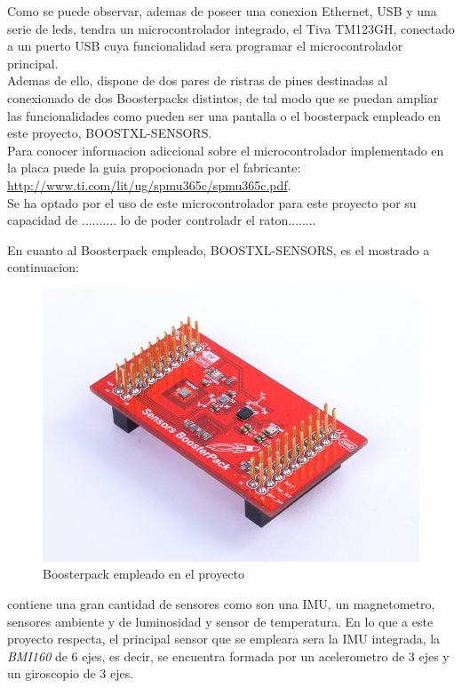 \documentclass[a4paper,twoside]{article}
\begin{document}
Como se puede observar, ademas de poseer una conexion Ethernet, USB y una serie de leds, tendra un microcontrolador integrado, el Tiva TM123GH, conectado a un puerto USB cuya funcionalidad sera programar el microcontrolador principal. \\
Ademas de ello, dispone de dos pares de ristras de pines destinadas al conexionado de dos Boosterpacks distintos, de tal modo que se puedan ampliar las funcionalidades como pueden ser una pantalla o el boosterpack empleado en este proyecto, BOOSTXL-SENSORS. \\

Para conocer informacion adiccional sobre el microcontrolador implementado en la placa puede la guia propocionada por el fabricante: \url{http://www.ti.com/lit/ug/spmu365c/spmu365c.pdf}. \\

Se ha optado por el uso de este microcontrolador para este proyecto por su capacidad de .......... lo de poder controladr el raton........
\newpage

En cuanto al Boosterpack empleado, BOOSTXL-SENSORS, es el mostrado a continuacion: \\
\begin{figure}[h!]
 \centering
 \includegraphics[width=.3\textwidth]{../images/sensors_bp}
 \caption{Boosterpack empleado en el proyecto}
\end{figure}

contiene una gran cantidad de sensores como son una IMU, un magnetometro, sensores ambiente y de luminosidad y sensor de temperatura. En lo que a este proyecto respecta, el principal sensor que se empleara sera la IMU integrada, la \textit{BMI160} de 6 ejes, es decir, se encuentra formada por un acelerometro de 3 ejes y un giroscopio de 3 ejes. \\
\end{document}
